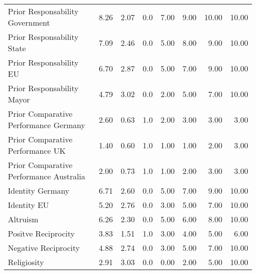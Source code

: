 \begin{table}
{\begin{tabular}[t]{lrrrrrrr}
Prior Responsability Government & 8.26 & 2.07 & 0.0 & 7.00 & 9.00 & 10.00 & 10.00\\
Prior Responsability State & 7.09 & 2.46 & 0.0 & 5.00 & 8.00 & 9.00 & 10.00\\
Prior Responsability EU & 6.70 & 2.87 & 0.0 & 5.00 & 7.00 & 9.00 & 10.00\\
Prior Responsability Mayor & 4.79 & 3.02 & 0.0 & 2.00 & 5.00 & 7.00 & 10.00\\
Prior Comparative Performance Germany & 2.60 & 0.63 & 1.0 & 2.00 & 3.00 & 3.00 & 3.00\\
Prior Comparative Performance UK & 1.40 & 0.60 & 1.0 & 1.00 & 1.00 & 2.00 & 3.00\\
Prior Comparative Performance Australia & 2.00 & 0.73 & 1.0 & 1.00 & 2.00 & 3.00 & 3.00\\
Identity Germany & 6.71 & 2.60 & 0.0 & 5.00 & 7.00 & 9.00 & 10.00\\
Identity EU & 5.20 & 2.76 & 0.0 & 3.00 & 5.00 & 7.00 & 10.00\\
Altruism & 6.26 & 2.30 & 0.0 & 5.00 & 6.00 & 8.00 & 10.00\\
Positve Reciprocity & 3.83 & 1.51 & 1.0 & 3.00 & 4.00 & 5.00 & 6.00\\
Negative Reciprocity & 4.88 & 2.74 & 0.0 & 3.00 & 5.00 & 7.00 & 10.00\\
Religiosity & 2.91 & 3.03 & 0.0 & 0.00 & 2.00 & 5.00 & 10.00\\
\bottomrule
\end{tabular}}
\end{table}
